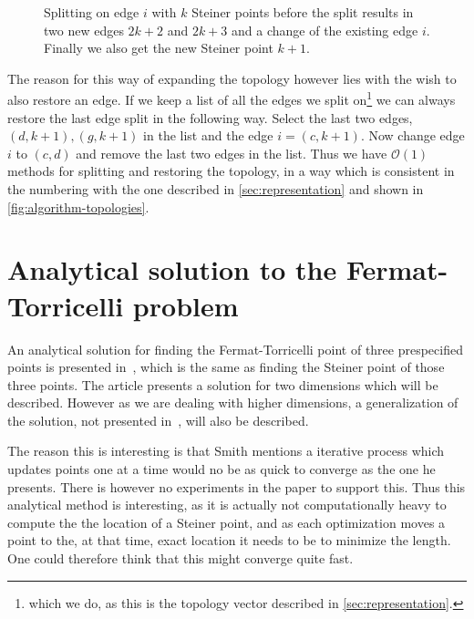 \begin{figure}[htbp]
  \centering
  
  \caption{Splitting on edge $i$ with $k$ Steiner points before the
    split results in two new edges $2k+2$ and $2k+3$ and a change of the existing edge $i$.  Finally we
  also get the new Steiner point $k + 1$.\label{fig:splitting-topology}}
\end{figure}

The reason for this way of expanding the topology however lies with the wish to
also restore an edge.  If we keep a list of all the edges we split
on\footnote{which we do, as this is the topology vector described in
  \cref{sec:representation}.} we can always restore the last edge split in the
following way.  Select the last two edges, $(d, k+1), (g, k+1)$ in the list and
the edge $i = (c, k+1)$.  Now change edge $i$ to $(c, d)$ and remove the last
two edges in the list.  Thus we have $\mathcal{O}(1)$ methods for splitting and
restoring the topology, in a way which is consistent in the numbering with the
one described in \cref{sec:representation} and shown in
\cref{fig:algorithm-topologies}.


\section{Analytical solution to the Fermat-Torricelli problem}
\label{sec:analyt-solut-ferm}

An analytical solution for finding the Fermat-Torricelli point of three
prespecified points is presented in~\cite{Uteshev2012}, which is the same as
finding the Steiner point of those three points.  The article presents a
solution for two dimensions which will be described.  However as we are dealing
with  higher dimensions, a generalization of the solution, not presented
in~\cite{Uteshev2012}, will also be described.

The reason this is interesting is that Smith mentions a iterative process which
updates points one at a time would no be as quick to converge as the one he
presents.  There is however no experiments in the paper to support this.  Thus
this analytical method is interesting, as it is actually not computationally
heavy to compute the the location of a Steiner point, and as each optimization
moves a point to the, at that time, exact location it needs to be to minimize
the length.  One could therefore think that this might converge quite fast.

